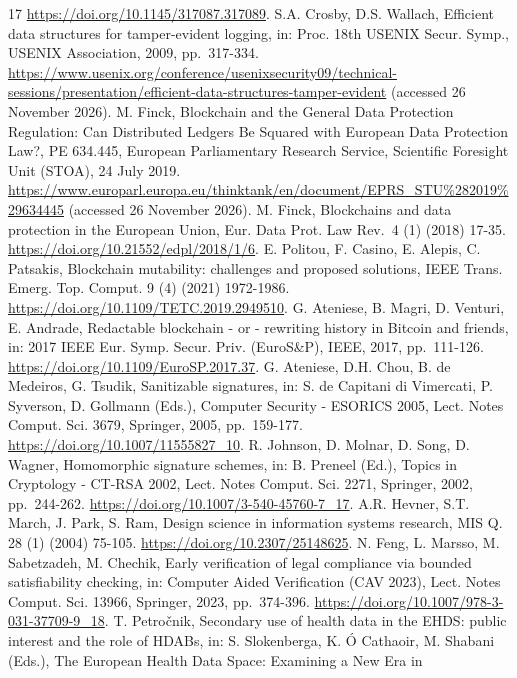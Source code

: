 \documentclass[preprint,review,12pt]{elsarticle}
\begin{document}
\begin{thebibliography}{17}
\url{https://doi.org/10.1145/317087.317089}.
 S.A. Crosby, D.S. Wallach, Efficient data structures for
tamper-evident logging, in: Proc. 18th USENIX Secur. Symp., USENIX
Association, 2009, pp.~317-334.
\url{https://www.usenix.org/conference/usenixsecurity09/technical-sessions/presentation/efficient-data-structures-tamper-evident}
(accessed 26 November 2026).
 M. Finck, Blockchain and the General Data Protection Regulation:
Can Distributed Ledgers Be Squared with European Data Protection Law?,
PE 634.445, European Parliamentary Research Service, Scientific
Foresight Unit (STOA), 24 July 2019.
\url{https://www.europarl.europa.eu/thinktank/en/document/EPRS_STU\%282019\%29634445}
(accessed 26 November 2026).
 M. Finck, Blockchains and data protection in the European
Union, Eur. Data Prot. Law Rev.~4 (1) (2018) 17-35.
\url{https://doi.org/10.21552/edpl/2018/1/6}.
 E. Politou, F. Casino, E. Alepis, C. Patsakis, Blockchain
mutability: challenges and proposed solutions, IEEE Trans. Emerg. Top.
Comput. 9 (4) (2021) 1972-1986.
\url{https://doi.org/10.1109/TETC.2019.2949510}.
 G. Ateniese, B. Magri, D. Venturi, E. Andrade, Redactable
blockchain - or - rewriting history in Bitcoin and friends, in: 2017
IEEE Eur. Symp. Secur. Priv. (EuroS\&P), IEEE, 2017, pp.~111-126.
\url{https://doi.org/10.1109/EuroSP.2017.37}.
 G. Ateniese, D.H. Chou, B. de Medeiros, G. Tsudik, Sanitizable
signatures, in: S. de Capitani di Vimercati, P. Syverson, D. Gollmann
(Eds.), Computer Security - ESORICS 2005, Lect. Notes Comput. Sci. 3679,
Springer, 2005, pp.~159-177. \url{https://doi.org/10.1007/11555827_10}.
 R. Johnson, D. Molnar, D. Song, D. Wagner, Homomorphic
signature schemes, in: B. Preneel (Ed.), Topics in Cryptology - CT-RSA
2002, Lect. Notes Comput. Sci. 2271, Springer, 2002, pp.~244-262.
\url{https://doi.org/10.1007/3-540-45760-7_17}.
 A.R. Hevner, S.T. March, J. Park, S. Ram, Design science in
information systems research, MIS Q. 28 (1) (2004) 75-105.
\url{https://doi.org/10.2307/25148625}.
 N. Feng, L. Marsso, M. Sabetzadeh, M. Chechik, Early
verification of legal compliance via bounded satisfiability checking,
in: Computer Aided Verification (CAV 2023), Lect. Notes Comput. Sci.
13966, Springer, 2023, pp.~374-396.
\url{https://doi.org/10.1007/978-3-031-37709-9_18}.
 T. Petročnik, Secondary use of health data in the EHDS: public
interest and the role of HDABs, in: S. Slokenberga, K. Ó Cathaoir, M.
Shabani (Eds.), The European Health Data Space: Examining a New Era in

\end{thebibliography}
\end{document}
